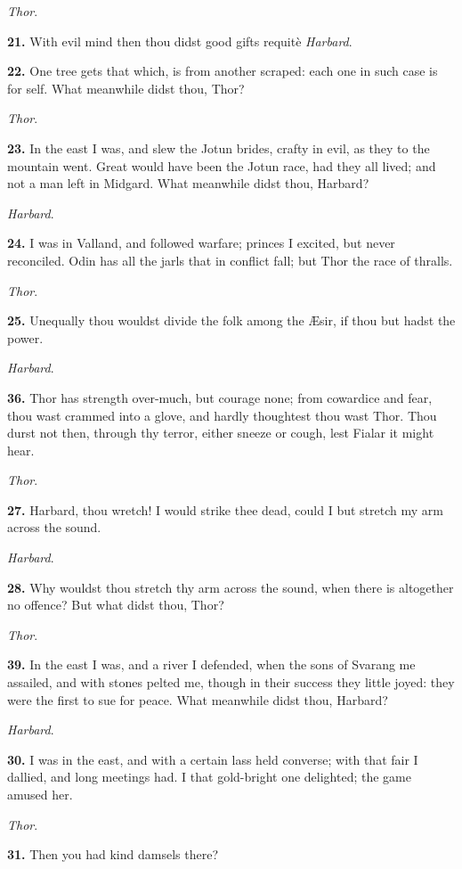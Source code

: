\emph{Thor}.

\textbf{21.} With evil mind then thou didst good gifts requitè \emph{Harbard}.

\textbf{22.} One tree gets that which, is from another scraped: each one in
such case is for self. What meanwhile didst thou, Thor?

\emph{Thor}.

\textbf{23.} In the east I was, and slew the Jotun brides, crafty in evil, as
they to the mountain went. Great would have been the Jotun race, had
they all lived; and not a man left in Midgard. What meanwhile didst
thou, Harbard?

\emph{Harbard}.

\textbf{24.} I was in Valland, and followed warfare; princes I excited, but
never reconciled. Odin has all the jarls that in conflict fall; but
Thor the race of thralls.

\emph{Thor}.

\textbf{25.} Unequally thou wouldst divide the folk among the Æsir, if thou
but hadst the power.

\emph{Harbard}.

\textbf{36.} Thor has strength over-much, but courage none; from cowardice
and fear, thou wast crammed into a glove, and hardly thoughtest thou
wast Thor. Thou durst not then, through thy terror, either sneeze or
cough, lest Fialar it might hear.

\emph{Thor}.

\textbf{27.} Harbard, thou wretch! I would strike thee dead, could I but
stretch my arm across the sound.

\emph{Harbard}.

\textbf{28.} Why wouldst thou stretch thy arm across the sound, when there is
altogether no offence? But what didst thou, Thor?

\emph{Thor}.

\textbf{39.} In the east I was, and a river I defended, when the sons of
Svarang me assailed, and with stones pelted me, though in their
success they little joyed: they were the first to sue for peace. What
meanwhile didst thou, Harbard?

\emph{Harbard}.

\textbf{30.} I was in the east, and with a certain lass held converse; with
that fair I dallied, and long meetings had. I that gold-bright one
delighted; the game amused her.

\emph{Thor}.

\textbf{31.} Then you had kind damsels there?


